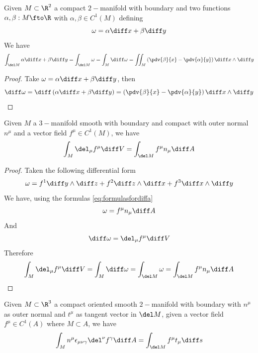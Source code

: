 \documentclass[../mmf.tex]{subfiles}
\begin{document}
\begin{dfn}
	Given $M\subset\R^2$ a compact $2-$manifold with boundary and two functions $\alpha,\beta:M\fto\R$ with $\alpha,\beta\in C^1(M)$ defining
	\begin{equation}
		\omega=\alpha\diff x+\beta\diff y
		\label{eq:ggman}
	\end{equation}
	We have
	\begin{equation}
		\int_{\del M}\alpha\diff x+\beta\diff y=\int_{\del M}\omega=\int_M\diff\omega=\iint_M\left( \pdv{\beta}{x}-\pdv{\alpha}{y} \right)\diff x\wedge\diff y
		\label{eq:gaussgreendf}
	\end{equation}
\end{dfn}
\begin{proof}
	Take $\omega=\alpha\diff x+\beta\diff y$, then
	\begin{equation*}
		\diff\omega=\diff\left( \alpha\diff x+\beta\diff y \right)=\left( \pdv{\beta}{x}-\pdv{\alpha}{y} \right)\diff x\wedge\diff y
	\end{equation*}
\end{proof}
\begin{thm}
	Given $M$ a $3-$manifold smooth with boundary and compact with outer normal $n^\mu$ and a vector field $f^\mu\in C^1(M)$, we have
	\begin{equation}
		\int_M\del_\mu f^\mu\diff V=\int_{\del M}f^\mu n_\mu\diff A
		\label{eq:gaussdf}
	\end{equation}
\end{thm}
\begin{proof}
	Taken the following differential form
	\begin{equation*}
		\omega=f^1\diff y\wedge\diff z+f^2\diff z\wedge\diff x+f^3\diff x\wedge\diff y
	\end{equation*}
	We have, using the formulas \eqref{eq:formulasfordiffa}
	\begin{equation*}
		\omega=f^\mu n_\mu\diff A
	\end{equation*}
	And
	\begin{equation*}
		\diff\omega=\del_\mu f^\mu\diff V
	\end{equation*}
	Therefore
	\begin{equation*}
		\int_M\del_\mu f^\mu\diff V=\int_M\diff\omega=\int_{\del M}\omega=\int_{\del M}f^\mu n_\mu\diff A
	\end{equation*}
\end{proof}
\begin{thm}
	Given $M\subset\R^3$ a compact oriented smooth $2-$manifold with boundary with $n^\mu$ as outer normal and $t^\mu$ as tangent vector in $\del M$, given a vector field $f^\mu\in C^1(A)$ where $M\subset A$, we have
	\begin{equation}
		\int_Mn^\mu\epsilon_{\mu\nu\gamma}\del^\nu f^\gamma\diff A=\int_{\del M}f^\mu t_\mu\diff s
		\label{eq:stokesrotordf}
	\end{equation}
\end{thm}
\end{document}
